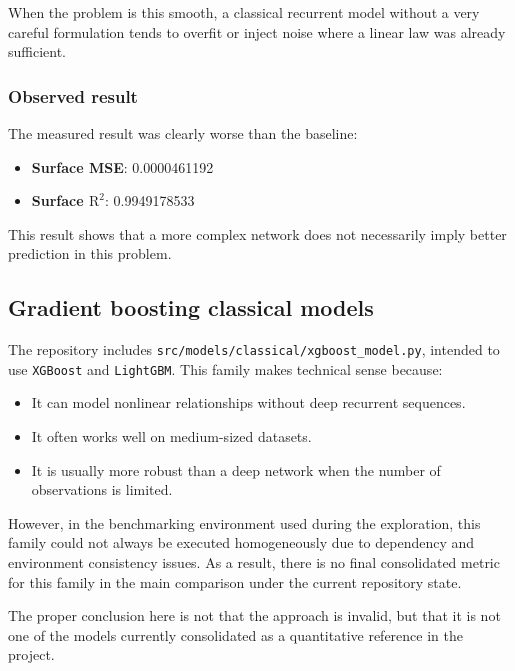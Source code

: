 \documentclass[11pt,a4paper]{article}
\newcommand{\Rtwo}{\ensuremath{\mathrm{R}^2}}
\begin{document}
When the problem is this smooth, a classical recurrent model without a very careful formulation tends to overfit or inject noise where a linear law was already sufficient.

\subsubsection{Observed result}
The measured result was clearly worse than the baseline:

\begin{itemize}
    \item \textbf{Surface MSE}: 0.0000461192
    \item \textbf{Surface $\Rtwo$}: 0.9949178533
\end{itemize}

This result shows that a more complex network does not necessarily imply better prediction in this problem.

\subsection{Gradient boosting classical models}

The repository includes \texttt{src/models/classical/xgboost\_model.py}, intended to use \texttt{XGBoost} and \texttt{LightGBM}. This family makes technical sense because:

\begin{itemize}
    \item It can model nonlinear relationships without deep recurrent sequences.
    \item It often works well on medium-sized datasets.
    \item It is usually more robust than a deep network when the number of observations is limited.
\end{itemize}

However, in the benchmarking environment used during the exploration, this family could not always be executed homogeneously due to dependency and environment consistency issues. As a result, there is no final consolidated metric for this family in the main comparison under the current repository state.

The proper conclusion here is not that the approach is invalid, but that it is not one of the models currently consolidated as a quantitative reference in the project.

\end{document}
